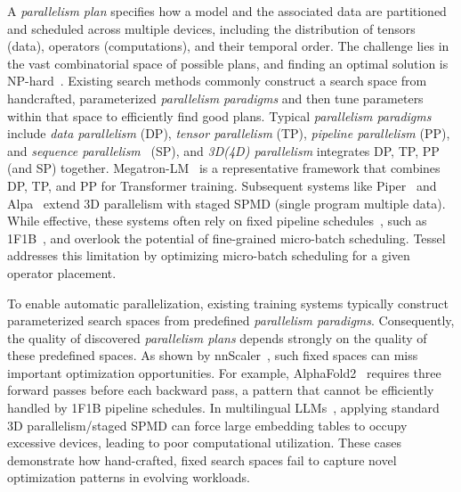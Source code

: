 \documentclass[letterpaper,twocolumn,10pt]{article}
\begin{document}
A \textit{parallelism plan} specifies how a model and the associated data are partitioned and scheduled across multiple devices, including the distribution of tensors (data), operators (computations), and their temporal order. The challenge lies in the vast combinatorial space of possible plans, and finding an optimal solution is NP-hard~\cite{liu2024aceso}. Existing search methods commonly construct a search space from handcrafted, parameterized \textit{parallelism paradigms} and then tune parameters within that space to efficiently find good plans. Typical \textit{parallelism paradigms} include \textit{data parallelism} (DP), \textit{tensor parallelism} (TP), \textit{pipeline parallelism} (PP), and \textit{sequence parallelism}~\cite{li2023sequence} (SP), and \textit{3D(4D) parallelism} integrates DP, TP, PP (and SP) together. Megatron-LM~\cite{shoeybi2019megatron, narayanan2021efficient} is a representative framework that combines DP, TP, and PP for Transformer training. Subsequent systems like Piper~\cite{tarnawski2021piper} and Alpa~\cite{zheng2022alpa} extend 3D parallelism with staged SPMD (single program multiple data). While effective, these systems often rely on fixed pipeline schedules~\cite{qi2024zero}, such as 1F1B~\cite{huang2019gpipe}, and overlook the potential of fine-grained micro-batch scheduling. Tessel~\cite{lin2024tessel} addresses this limitation by optimizing micro-batch scheduling for a given operator placement.


To enable automatic parallelization, existing training systems typically construct parameterized search spaces from predefined \textit{parallelism paradigms}. Consequently, the quality of discovered \textit{parallelism plans} depends strongly on the quality of these predefined spaces. As shown by nnScaler~\cite{lin2024nnscaler}, such fixed spaces can miss important optimization opportunities. For example, AlphaFold2~\cite{jumper2021highly} requires three forward passes before each backward pass, a pattern that cannot be efficiently handled by 1F1B pipeline schedules. In multilingual LLMs~\cite{ni2022sentence}, applying standard 3D parallelism/staged SPMD can force large embedding tables to occupy excessive devices, leading to poor computational utilization. These cases demonstrate how hand-crafted, fixed search spaces fail to capture novel optimization patterns in evolving workloads.


\vspace{-.5em}
\end{document}
